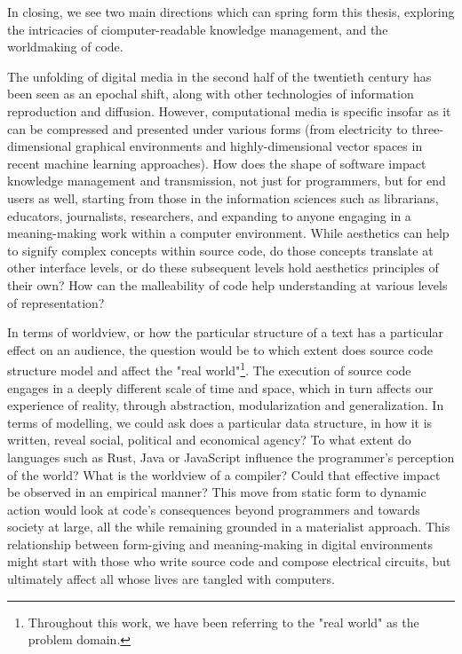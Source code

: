\spacer

In closing, we see two main directions which can spring form this thesis, exploring the intricacies of ciomputer-readable knowledge management, and the worldmaking of code.

The unfolding of digital media in the second half of the twentieth century has been seen as an epochal shift, along with other technologies of information reproduction and diffusion. However, computational media is specific insofar as it can be compressed and presented under various forms (from electricity to three-dimensional graphical environments and highly-dimensional vector spaces in recent machine learning approaches). How does the shape of software impact knowledge management and transmission, not just for programmers, but for end users as well, starting from those in the information sciences such as librarians, educators, journalists, researchers, and expanding to anyone engaging in a meaning-making work within a computer environment. While aesthetics can help to signify complex concepts within source code, do those concepts translate at other interface levels, or do these subsequent levels hold aesthetics principles of their own? How can the malleability of code help understanding at various levels of representation?

In terms of worldview, or how the particular structure of a text has a particular effect on an audience, the question would be to which extent does source code structure model and affect the "real world"\footnote{Throughout this work, we have been referring to the "real world" as the problem domain.}. The execution of source code engages in a deeply different scale of time and space, which in turn affects our experience of reality, through abstraction, modularization and generalization. In terms of modelling, we could ask does a particular data structure, in how it is written, reveal social, political and economical agency? To what extent do languages such as Rust, Java or JavaScript influence the programmer's perception of the world? What is the worldview of a compiler? Could that effective impact be observed in an empirical manner? This move from static form to dynamic action would look at code's consequences beyond programmers and towards society at large, all the while remaining grounded in a materialist approach. This relationship between form-giving and meaning-making in digital environments might start with those who write source code and compose electrical circuits, but ultimately affect all whose lives are tangled with computers.
